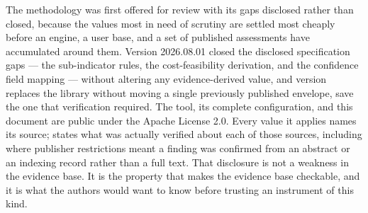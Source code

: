 The methodology was first offered for review with its gaps disclosed rather
than closed, because the values most in need of scrutiny are settled most
cheaply before an engine, a user base, and a set of published assessments have
accumulated around them. Version 2026.08.01 closed the disclosed specification
gaps --- the sub-indicator rules, the cost-feasibility derivation, and the
confidence field mapping --- without altering any evidence-derived value, and
version \methver{} replaces the library without moving a single previously
published envelope, save the one that verification required.
The tool, its complete configuration, and this
document are public under the Apache License 2.0. Every value it applies names
its source;  states what was actually verified about
each of those sources, including where publisher restrictions meant a finding
was confirmed from an abstract or an indexing record rather than a full text.
That disclosure is not a weakness in the evidence base. It is the property that
makes the evidence base checkable, and it is what the authors would want to
know before trusting an instrument of this kind.

